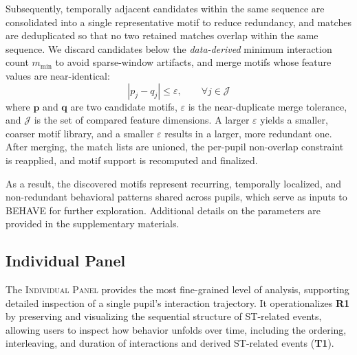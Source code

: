 \documentclass[letterpaper,journal]{IEEEtran}
\begin{document}
Subsequently, temporally adjacent candidates within the same sequence are consolidated into a single representative motif to reduce redundancy, and matches are deduplicated so that no two retained matches overlap within the same sequence.
We discard candidates below the \textit{data-derived} minimum interaction count $m_{\min}$ to avoid sparse-window artifacts, and merge motifs whose feature values are near-identical:
\begin{equation}
|p_j - q_j| \le \varepsilon,
\qquad
\forall j \in \mathcal{J}
\end{equation}
where $\mathbf{p}$ and $\mathbf{q}$ are two candidate motifs, $\varepsilon$ is the near-duplicate merge tolerance, and $\mathcal{J}$ is the set of compared feature dimensions.
A larger $\varepsilon$ yields a smaller, coarser motif library, and a smaller $\varepsilon$ results in a larger, more redundant one.
After merging, the match lists are unioned, the per-pupil non-overlap constraint is reapplied, and motif support is recomputed and finalized.

As a result, the discovered motifs represent recurring, temporally localized, and non-redundant behavioral patterns shared across pupils, which serve as inputs to \textsc{BEHAVE} for further exploration.
Additional details on the parameters are provided in the supplementary materials.



\subsection{Individual Panel}
\label{subsec:individual_panel}

The \textsc{Individual Panel} provides the most fine-grained level of analysis, supporting detailed inspection of a single pupil's interaction trajectory. 
It operationalizes \textbf{R1} by preserving and visualizing the sequential structure of ST-related events, allowing users to inspect how behavior unfolds over time, including the ordering, interleaving, and duration of interactions and derived ST-related events (\textbf{T1}).
\end{document}
